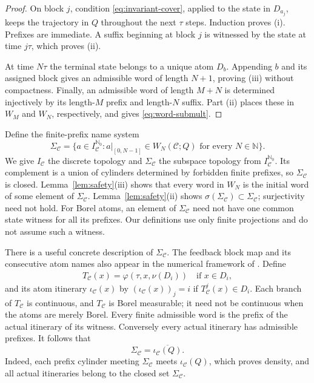 \documentclass[11pt,reqno]{amsart}
\numberwithin{equation}{section}
\theoremstyle{definition}
\newcommand{\N}{\mathbb N}
\newcommand{\Nzero}{\mathbb N_0}
\newcommand{\C}{\mathcal C}
\begin{document}
\begin{proof}
On block $j$, condition \eqref{eq:invariant-cover}, applied to the state in
$D_{a_j}$, keeps the trajectory in $Q$ throughout the next $\tau$ steps.
Induction proves (i).  Prefixes are immediate.  A suffix beginning at block
$j$ is witnessed by the state at time $j\tau$, which proves (ii).

At time $N\tau$ the terminal state belongs to a unique atom $D_b$.
Appending $b$ and its assigned block gives an admissible word of length
$N+1$, proving (iii) without compactness.  Finally, an admissible word of
length $M+N$ is determined injectively by its length-$M$ prefix and
length-$N$ suffix.  Part (ii) places these in $W_M$ and $W_N$, respectively,
and gives \eqref{eq:word-submult}.
\end{proof}

Define the finite-prefix name system
\begin{equation}\label{eq:name-system}
 \Sigma_\C=\bigl\{a\in I_\C^{\Nzero}:a|_{[0,N-1]}\in W_N(\C;Q)
 \text{ for every }N\in\N\bigr\}.
\end{equation}
We give $I_\C$ the discrete topology and $\Sigma_\C$ the subspace topology
from $I_\C^{\Nzero}$.  Its complement is a union of cylinders determined by
forbidden finite prefixes, so $\Sigma_\C$ is closed.
Lemma~\ref{lem:safety}(iii) shows that every word in $W_N$ is the initial
word of some element of $\Sigma_\C$.  Lemma~\ref{lem:safety}(ii) shows
$\sigma(\Sigma_\C)\subset\Sigma_\C$; surjectivity need not hold.  For Borel
atoms, an element of $\Sigma_\C$ need not have one common state witness for
all its prefixes.  Our definitions use only finite projections and do not
assume such a witness.

There is a useful concrete description of $\Sigma_\C$. The feedback
block map and its consecutive atom names also appear in the numerical
framework of \cite[Section~2]{TomarKawanZamani2022}. Define
\begin{align*}
 T_\C(x)=\varphi(\tau,x,\nu(D_i))\quad\text{if }x\in D_i,
\end{align*}
and its atom itinerary $\iota_\C(x)$ by
$(\iota_\C(x))_j=i$ if $T_\C^j(x)\in D_i$.
Each branch of $T_\C$ is continuous, and $T_\C$ is Borel measurable;
it need not be continuous when the atoms are merely Borel. Every finite
admissible word is the prefix of the actual itinerary of its witness.
Conversely every actual itinerary has admissible prefixes. It follows that
\begin{equation}\label{eq:itinerary-closure}
 \Sigma_\C=\overline{\iota_\C(Q)}.
\end{equation}
Indeed, each prefix cylinder meeting $\Sigma_\C$ meets
$\iota_\C(Q)$, which proves density, and all actual itineraries belong
to the closed set $\Sigma_\C$.
\end{document}
